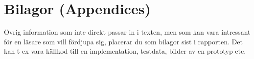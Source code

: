 \section{Bilagor (Appendices)}

\"Ovrig information som inte direkt passar in i texten, men som kan vara intressant f\"or en l\"asare som vill f\"ordjupa sig, placerar du som bilagor sist i rapporten. Det kan t ex vara k\"allkod till en implementation, testdata, bilder av en prototyp etc.


